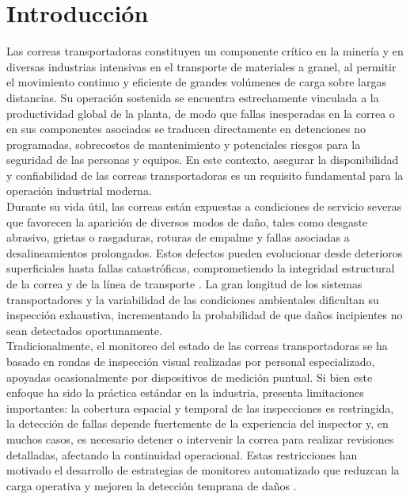 \chapter{Introducción}

Las correas transportadoras constituyen un componente crítico en la minería y en diversas industrias intensivas en el transporte de materiales a granel, al permitir el movimiento continuo y eficiente de grandes volúmenes de carga sobre largas distancias. Su operación sostenida se encuentra estrechamente vinculada a la productividad global de la planta, de modo que fallas inesperadas en la correa o en sus componentes asociados se traducen directamente en detenciones no programadas, sobrecostos de mantenimiento y potenciales riesgos para la seguridad de las personas y equipos. En este contexto, asegurar la disponibilidad y confiabilidad de las correas transportadoras es un requisito fundamental para la operación industrial moderna. \\

Durante su vida útil, las correas están expuestas a condiciones de servicio severas que favorecen la aparición de diversos modos de daño, tales como desgaste abrasivo, grietas o rasgaduras, roturas de empalme y fallas asociadas a desalineamientos prolongados. Estos defectos pueden evolucionar desde deterioros superficiales hasta fallas catastróficas, comprometiendo la integridad estructural de la correa y de la línea de transporte \cite{khanna2022types}. La gran longitud de los sistemas transportadores y la variabilidad de las condiciones ambientales dificultan su inspección exhaustiva, incrementando la probabilidad de que daños incipientes no sean detectados oportunamente. \\

Tradicionalmente, el monitoreo del estado de las correas transportadoras se ha basado en rondas de inspección visual realizadas por personal especializado, apoyadas ocasionalmente por dispositivos de medición puntual. Si bien este enfoque ha sido la práctica estándar en la industria, presenta limitaciones importantes: la cobertura espacial y temporal de las inspecciones es restringida, la detección de fallas depende fuertemente de la experiencia del inspector y, en muchos casos, es necesario detener o intervenir la correa para realizar revisiones detalladas, afectando la continuidad operacional. Estas restricciones han motivado el desarrollo de estrategias de monitoreo automatizado que reduzcan la carga operativa y mejoren la detección temprana de daños \cite{angulo2024deteccion}. \\

